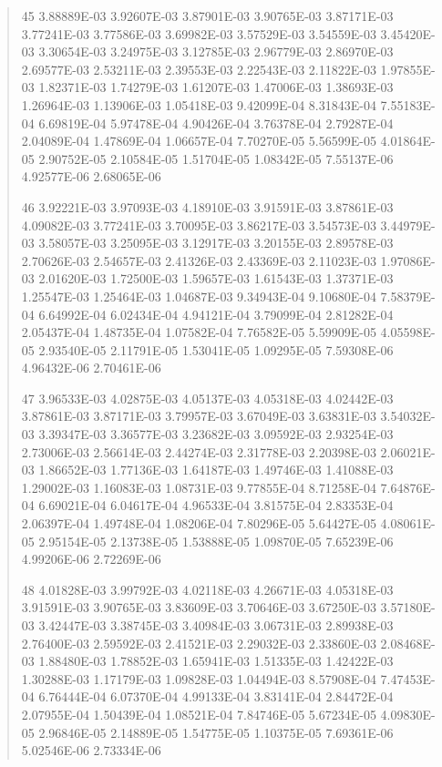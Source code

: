 \documentclass[letterpaper,10pt,english]{sphinxmanual}
\begin{document}
\begin{quote}
\begin{DUlineblock}{0em}
\item[] 45   3.88889E-03  3.92607E-03  3.87901E-03  3.90765E-03  3.87171E-03  3.77241E-03  3.77586E-03  3.69982E-03  3.57529E-03  3.54559E-03  3.45420E-03  3.30654E-03  3.24975E-03  3.12785E-03  2.96779E-03  2.86970E-03  2.69577E-03  2.53211E-03  2.39553E-03  2.22543E-03  2.11822E-03  1.97855E-03  1.82371E-03  1.74279E-03  1.61207E-03  1.47006E-03  1.38693E-03  1.26964E-03  1.13906E-03  1.05418E-03  9.42099E-04  8.31843E-04  7.55183E-04  6.69819E-04  5.97478E-04  4.90426E-04  3.76378E-04  2.79287E-04  2.04089E-04  1.47869E-04  1.06657E-04  7.70270E-05  5.56599E-05  4.01864E-05  2.90752E-05  2.10584E-05  1.51704E-05  1.08342E-05  7.55137E-06  4.92577E-06  2.68065E-06
\item[] 46   3.92221E-03  3.97093E-03  4.18910E-03  3.91591E-03  3.87861E-03  4.09082E-03  3.77241E-03  3.70095E-03  3.86217E-03  3.54573E-03  3.44979E-03  3.58057E-03  3.25095E-03  3.12917E-03  3.20155E-03  2.89578E-03  2.70626E-03  2.54657E-03  2.41326E-03  2.43369E-03  2.11023E-03  1.97086E-03  2.01620E-03  1.72500E-03  1.59657E-03  1.61543E-03  1.37371E-03  1.25547E-03  1.25464E-03  1.04687E-03  9.34943E-04  9.10680E-04  7.58379E-04  6.64992E-04  6.02434E-04  4.94121E-04  3.79099E-04  2.81282E-04  2.05437E-04  1.48735E-04  1.07582E-04  7.76582E-05  5.59909E-05  4.05598E-05  2.93540E-05  2.11791E-05  1.53041E-05  1.09295E-05  7.59308E-06  4.96432E-06  2.70461E-06
\item[] 47   3.96533E-03  4.02875E-03  4.05137E-03  4.05318E-03  4.02442E-03  3.87861E-03  3.87171E-03  3.79957E-03  3.67049E-03  3.63831E-03  3.54032E-03  3.39347E-03  3.36577E-03  3.23682E-03  3.09592E-03  2.93254E-03  2.73006E-03  2.56614E-03  2.44274E-03  2.31778E-03  2.20398E-03  2.06021E-03  1.86652E-03  1.77136E-03  1.64187E-03  1.49746E-03  1.41088E-03  1.29002E-03  1.16083E-03  1.08731E-03  9.77855E-04  8.71258E-04  7.64876E-04  6.69021E-04  6.04617E-04  4.96533E-04  3.81575E-04  2.83353E-04  2.06397E-04  1.49748E-04  1.08206E-04  7.80296E-05  5.64427E-05  4.08061E-05  2.95154E-05  2.13738E-05  1.53888E-05  1.09870E-05  7.65239E-06  4.99206E-06  2.72269E-06
\item[] 48   4.01828E-03  3.99792E-03  4.02118E-03  4.26671E-03  4.05318E-03  3.91591E-03  3.90765E-03  3.83609E-03  3.70646E-03  3.67250E-03  3.57180E-03  3.42447E-03  3.38745E-03  3.40984E-03  3.06731E-03  2.89938E-03  2.76400E-03  2.59592E-03  2.41521E-03  2.29032E-03  2.33860E-03  2.08468E-03  1.88480E-03  1.78852E-03  1.65941E-03  1.51335E-03  1.42422E-03  1.30288E-03  1.17179E-03  1.09828E-03  1.04494E-03  8.57908E-04  7.47453E-04  6.76444E-04  6.07370E-04  4.99133E-04  3.83141E-04  2.84472E-04  2.07955E-04  1.50439E-04  1.08521E-04  7.84746E-05  5.67234E-05  4.09830E-05  2.96846E-05  2.14889E-05  1.54775E-05  1.10375E-05  7.69361E-06  5.02546E-06  2.73334E-06

\end{DUlineblock}
\end{quote}
\end{document}
